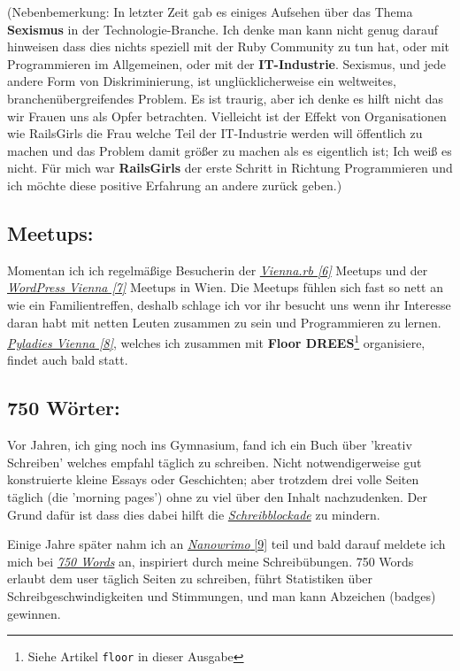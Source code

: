 (Nebenbemerkung: In letzter Zeit gab es einiges Aufsehen über das Thema \textbf{Sexismus} in der Technologie-Branche. Ich denke man kann nicht genug darauf hinweisen dass dies nichts speziell mit der Ruby Community zu tun hat, oder mit Programmieren im Allgemeinen, oder mit der \textbf{IT-Industrie}. Sexismus, und jede andere Form von Diskriminierung, ist unglücklicherweise ein weltweites, branchenübergreifendes Problem. Es ist traurig, aber ich denke es hilft nicht das wir Frauen uns als Opfer betrachten. Vielleicht ist der Effekt von Organisationen wie RailsGirls die Frau welche Teil der IT-Industrie werden will öffentlich zu machen und das Problem damit größer zu machen als es eigentlich ist; Ich weiß es nicht. Für mich war \textbf{RailsGirls} der erste Schritt in Richtung Programmieren und ich möchte diese positive Erfahrung an andere zurück geben.)

\subsection*{Meetups:}

Momentan ich ich regelmäßige Besucherin der \href{http://vienna.rb}{\textit{Vienna.rb [6]}} Meetups und der \href{http://wpvienna.com/}{\textit{WordPress Vienna [7]}} Meetups in Wien. Die Meetups fühlen sich fast so nett an wie ein Familientreffen, deshalb schlage ich vor ihr besucht uns wenn ihr Interesse daran habt mit netten Leuten zusammen zu sein und Programmieren zu lernen. \href{http://meetup.com/pyladies-vienna}{\textit{Pyladies Vienna [8]}}, welches ich zusammen mit \textbf{Floor DREES}\footnote{Siehe Artikel \texttt{floor} in dieser Ausgabe} organisiere, findet auch bald statt. 

\subsection*{750 Wörter:}

Vor Jahren, ich ging noch ins Gymnasium, fand ich ein Buch über 'kreativ Schreiben' welches empfahl täglich zu schreiben. Nicht notwendigerweise gut konstruierte kleine Essays oder Geschichten; aber trotzdem drei volle Seiten täglich (die 'morning pages') ohne zu viel über den Inhalt nachzudenken. Der Grund dafür ist dass dies dabei hilft die \href{https://de.wikipedia.org/wiki/Schreibblockade}{\textit{Schreibblockade}} zu mindern. 

Einige Jahre später nahm ich an \href{http://nanowrimo.org/}{\textit{Nanowrimo} [9]} teil und bald darauf meldete ich mich bei \href{https://750words.com/}{\textit{750 Words}} an, inspiriert durch meine Schreibübungen. 750 Words erlaubt dem user täglich Seiten zu schreiben, führt Statistiken über Schreibgeschwindigkeiten und Stimmungen, und man kann Abzeichen (badges) gewinnen. 

